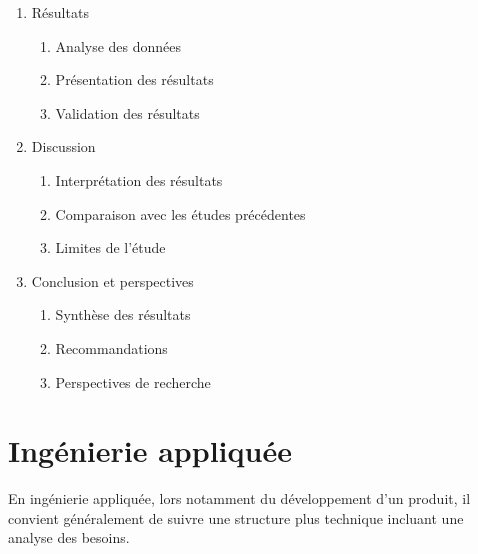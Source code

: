 \begin{enumerate}[label=\arabic*.]
    \item Résultats
          \begin{enumerate}[label=\arabic{enumi}.\arabic*]
              \item Analyse des données
              \item Présentation des résultats
              \item Validation des résultats
          \end{enumerate}

    \item Discussion
          \begin{enumerate}[label=\arabic{enumi}.\arabic*]
              \item Interprétation des résultats
              \item Comparaison avec les études précédentes
              \item Limites de l'étude
          \end{enumerate}

    \item Conclusion et perspectives
          \begin{enumerate}[label=\arabic{enumi}.\arabic*]
              \item Synthèse des résultats
              \item Recommandations
              \item Perspectives de recherche
          \end{enumerate}
\end{enumerate}

\section{Ingénierie appliquée}

En ingénierie appliquée, lors notamment du développement d'un produit, il convient généralement de suivre une structure plus technique incluant une analyse des besoins.

